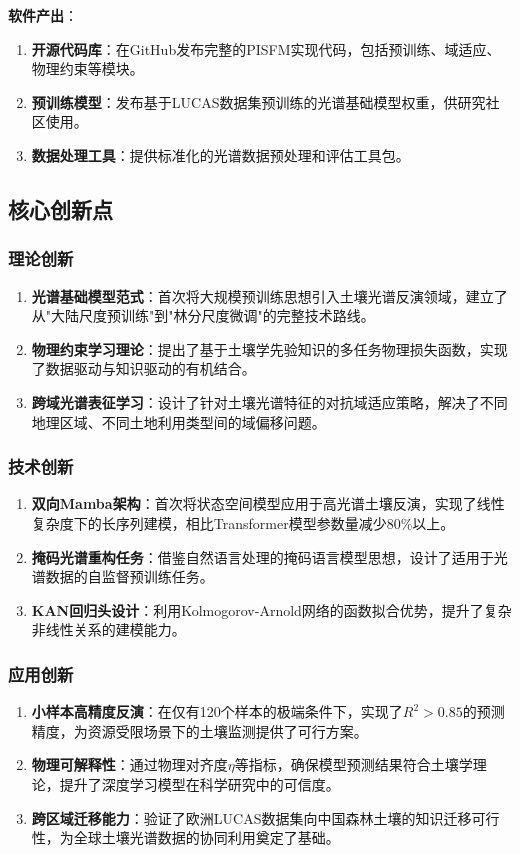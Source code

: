 \documentclass[12pt, a4paper]{article}
\begin{document}
\textbf{软件产出}：
\begin{enumerate}
    \item \textbf{开源代码库}：在GitHub发布完整的PISFM实现代码，包括预训练、域适应、物理约束等模块。
    \item \textbf{预训练模型}：发布基于LUCAS数据集预训练的光谱基础模型权重，供研究社区使用。
    \item \textbf{数据处理工具}：提供标准化的光谱数据预处理和评估工具包。
\end{enumerate}

\subsection{核心创新点}

\subsubsection{理论创新}
\begin{enumerate}
    \item \textbf{光谱基础模型范式}：首次将大规模预训练思想引入土壤光谱反演领域，建立了从"大陆尺度预训练"到"林分尺度微调"的完整技术路线。
    \item \textbf{物理约束学习理论}：提出了基于土壤学先验知识的多任务物理损失函数，实现了数据驱动与知识驱动的有机结合。
    \item \textbf{跨域光谱表征学习}：设计了针对土壤光谱特征的对抗域适应策略，解决了不同地理区域、不同土地利用类型间的域偏移问题。
\end{enumerate}

\subsubsection{技术创新}
\begin{enumerate}
    \item \textbf{双向Mamba架构}：首次将状态空间模型应用于高光谱土壤反演，实现了线性复杂度下的长序列建模，相比Transformer模型参数量减少80\%以上。
    \item \textbf{掩码光谱重构任务}：借鉴自然语言处理的掩码语言模型思想，设计了适用于光谱数据的自监督预训练任务。
    \item \textbf{KAN回归头设计}：利用Kolmogorov-Arnold网络的函数拟合优势，提升了复杂非线性关系的建模能力。
\end{enumerate}

\subsubsection{应用创新}
\begin{enumerate}
    \item \textbf{小样本高精度反演}：在仅有120个样本的极端条件下，实现了$R^2 > 0.85$的预测精度，为资源受限场景下的土壤监测提供了可行方案。
    \item \textbf{物理可解释性}：通过物理对齐度$\eta$等指标，确保模型预测结果符合土壤学理论，提升了深度学习模型在科学研究中的可信度。
    \item \textbf{跨区域迁移能力}：验证了欧洲LUCAS数据集向中国森林土壤的知识迁移可行性，为全球土壤光谱数据的协同利用奠定了基础。
\end{enumerate}
\end{document}
